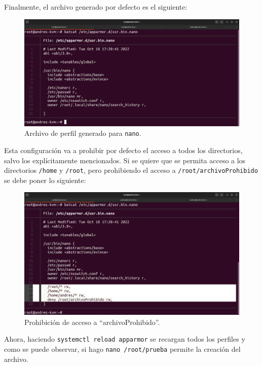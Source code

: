 \documentclass{article}
\begin{document}
\newpage

Finalmente, el archivo generado por defecto es el siguiente:
\begin{figure}[H]
    \centering
    \includegraphics[width=\textwidth]{imagenes/Captura desde 2022-10-18 17-23-45.png}
    \caption{Archivo de perfil generado para \texttt{nano}.}
\end{figure}

Esta configuración va a prohibir por defecto el acceso a todos los directorios, salvo los explícitamente mencionados. Si se quiere que se permita acceso a los directorios \verb|/home| y \verb|/root|, pero prohibiendo el acceso a \verb|/root/archivoProhibido| se debe poner lo siguiente:


\begin{figure}[H]
    \centering
    \includegraphics[width=\textwidth]{imagenes/Captura desde 2022-10-18 17-30-04.png}
    \caption{Prohibición de acceso a ``archivoProhibido''.}
\end{figure}

\newpage

Ahora, haciendo \verb|systemctl reload apparmor| se recargan todos los perfiles y como se puede observar, si hago \verb|nano /root/prueba| permite la creación del archivo.
\end{document}
